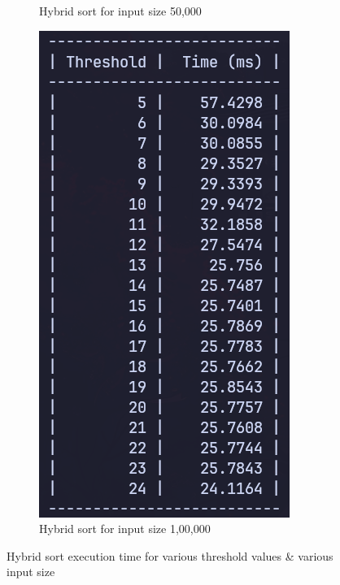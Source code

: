 \begin{figure}[H]
\begin{subfigure}[t]{0.4\textwidth}
        \caption{Hybrid sort for input size 50,000}
    \end{subfigure}
    \hfill
    \begin{subfigure}[t]{0.4\textwidth}
        \centering
        \includegraphics[scale=0.4]{img/task4/hi-1lac.png}
        \caption{Hybrid sort for input size 1,00,000}
    \end{subfigure}
    \caption{Hybrid sort execution time for various threshold values \&
    various input size}
    \label{fig:task2}
\end{figure}

